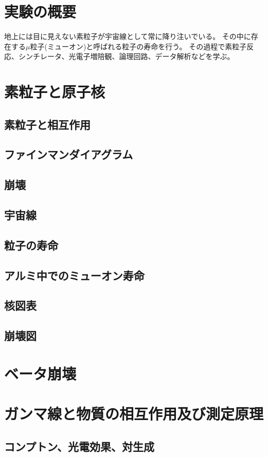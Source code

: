 \documentclass{jarticle}
\begin{document}
 \section*{実験の概要}
 地上には目に見えない素粒子が宇宙線として常に降り注いでいる。
 その中に存在する$\mu$粒子(ミューオン)と呼ばれる粒子の寿命を行う。
 その過程で素粒子反応、シンチレータ、光電子増陪観、論理回路、データ解析などを学ぶ。
 \section{素粒子と原子核}

  \subsection{素粒子と相互作用}
  \subsection{ファインマンダイアグラム}
  \subsection{崩壊}
  \subsection{宇宙線}
  \subsection{粒子の寿命}
  \subsection{アルミ中でのミューオン寿命}
  \subsection{核図表}
  \subsection{崩壊図}
  \section{ベータ崩壊}
  
  
  \section{ガンマ線と物質の相互作用及び測定原理}
  \subsection{コンプトン、光電効果、対生成}
\end{document}
